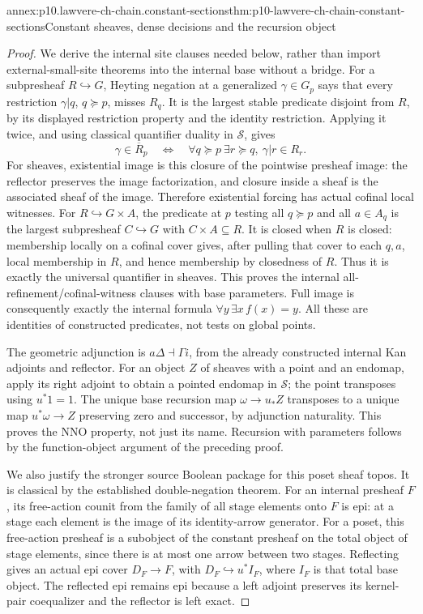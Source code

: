 \begin{annexitem}{annex:p10.lawvere-ch-chain.constant-sections}{thm:p10-lawvere-ch-chain-constant-sections}{Constant sheaves, dense decisions and the recursion object}
\begin{proof}
We derive the internal site clauses needed below, rather than import
external-small-site theorems into the internal base without a bridge.
For a subpresheaf \(R\hookrightarrow G\), Heyting negation at a
generalized \(\gamma\in G_p\) says that every restriction
\(\gamma|q\), \(q\succeq p\), misses \(R_q\). It is the largest
stable predicate disjoint from \(R\), by its displayed restriction
property and the identity restriction. Applying it twice, and using
classical quantifier duality in \(\mathcal S\), gives
\[
 \gamma\in\overline R_p
 \quad\Longleftrightarrow\quad
 \forall q\succeq p\ \exists r\succeq q,\ \gamma|r\in R_r .
\]
For sheaves, existential image is this closure of the pointwise
presheaf image: the reflector preserves the image factorization,
and closure inside a sheaf is the associated sheaf of the image.
Therefore existential forcing has actual cofinal local witnesses.
For \(R\hookrightarrow G\times A\), the predicate at \(p\) testing
all \(q\succeq p\) and all \(a\in A_q\) is the largest subpresheaf
\(C\hookrightarrow G\) with \(C\times A\subseteq R\).
It is closed when \(R\) is closed: membership locally on a cofinal
cover gives, after pulling that cover to each \(q,a\), local
membership in \(R\), and hence membership by closedness of \(R\).
Thus it is exactly the universal quantifier in sheaves.
This proves the internal all-refinement/cofinal-witness clauses with
base parameters. Full image is consequently exactly the internal
formula \(\forall y\,\exists x\, f(x)=y\). All these are identities
of constructed predicates, not tests on global points.

The geometric adjunction is \(a\Delta\dashv\Gamma i\), from the
already constructed internal Kan adjoints and reflector. For an object
\(Z\) of sheaves with a point and an endomap, apply its right adjoint
to obtain a pointed endomap in \(\mathcal S\); the point transposes
using \(u^*1=1\). The unique base recursion map \(\omega\to u_*Z\)
transposes to a unique map \(u^*\omega\to Z\) preserving zero and
successor, by adjunction naturality. This proves the NNO property, not
just its name. Recursion with parameters follows by the function-object
argument of the preceding proof.

We also justify the stronger source Boolean package for this poset
sheaf topos. It is classical by the established double-negation theorem.
For an internal presheaf \(F\), its free-action counit from the family
of all stage elements onto \(F\) is epi: at a stage each element is the
image of its identity-arrow generator. For a poset, this free-action
presheaf is a subobject of the constant presheaf on the total object
of stage elements, since there is at most one arrow between two stages.
Reflecting gives an actual epi cover \(D_F\to F\), with
\(D_F\hookrightarrow u^*I_F\), where \(I_F\) is that total base object.
The reflected epi remains epi because a left adjoint preserves its
kernel-pair coequalizer and the reflector is left exact.


\end{proof}
\end{annexitem}
